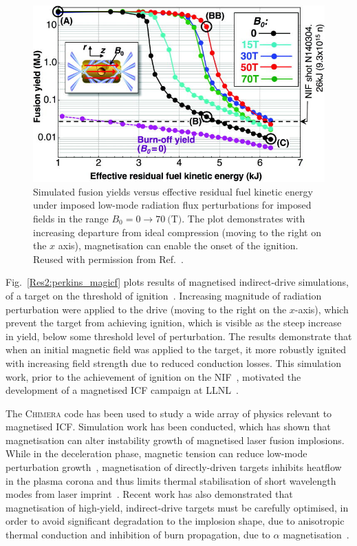 \begin{figure}[t!]
    \includegraphics[width=0.75\linewidth]{Results2/Images/magicf_perkins.jpeg}
    \centering
    \caption{Simulated fusion yields versus effective residual fuel kinetic energy under imposed low-mode radiation flux perturbations for imposed fields in the range $B_0=0\rightarrow70\ \text{(T)}$.
    The plot demonstrates with increasing departure from ideal compression (moving to the right on the $x$ axis), magnetisation can enable the onset of the ignition.
    Reused with permission from Ref.~\cite{perkins_potential_2017}.}%
    \label{fig:Res2_perkins_magicf}
\end{figure}

Fig.~\ref{Res2:perkins_magicf} plots results of magnetised indirect-drive simulations, of a target on the threshold of ignition~\cite{perkins_potential_2017}.
Increasing magnitude of radiation perturbation were applied to the drive (moving to the right on the $x$-axis), which prevent the target from achieving ignition, which is visible as the steep increase in yield, below some threshold level of perturbation.
The results demonstrate that when an initial magnetic field was applied to the target, it more robustly ignited with increasing field strength due to reduced conduction losses.
This simulation work, prior to the achievement of ignition on the \ac{NIF}~\cite{zylstra_burning_2022}, motivated the development of a magnetised \ac{ICF} campaign at \ac{LLNL}~\cite{moody_magnetized_2022}.

The \textsc{Chimera} code has been used to study a wide array of physics relevant to magnetised \ac{ICF}.
Simulation work has been conducted, which has shown that magnetisation can alter instability growth of magnetised laser fusion implosions.
While in the deceleration phase, magnetic tension can reduce low-mode perturbation growth~\cite{walsh_perturbation_2019}, magnetisation of directly-driven targets inhibits heatflow in the plasma corona and thus limits thermal stabilisation of short wavelength modes from laser imprint~\cite{walsh_magnetized_2020}.
Recent work has also demonstrated that magnetisation of high-yield, indirect-drive targets must be carefully optimised, in order to avoid significant degradation to the implosion shape, due to anisotropic thermal conduction and inhibition of burn propagation, due to $\alpha$ magnetisation~\cite{oneill_modelling_2023}.

